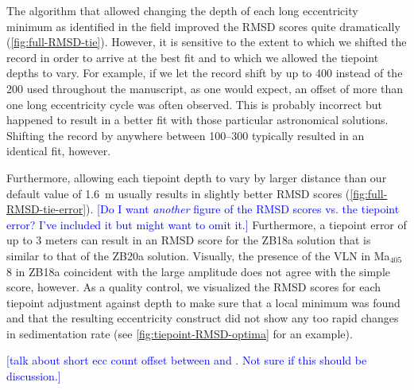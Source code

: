 \documentclass[draft]{agujournal2019}
\newcommand{\ma}[1]{Ma\(_{405}\)#1} %
\newcommand{\ijk}{\textcolor{blue}}
\begin{document}
The algorithm that allowed changing the depth of each long eccentricity minimum as identified in the field improved the \gls{RMSD} scores quite dramatically (\cref{fig:full-RMSD-tie}).
However, it is sensitive to the extent to which we shifted the record in order to arrive at the best fit and to which we allowed the tiepoint depths to vary.
For example, if we let the record shift by up to \qty{400}{\kiloyear} instead of the \qty{200}{\kiloyear} used throughout the manuscript, as one would expect, an offset of more than one long eccentricity cycle was often observed.
This is probably incorrect but happened to result in a better fit with those particular astronomical solutions.
Shifting the record by anywhere between \qtyrange{100}{300}{\kiloyear} typically resulted in an identical fit, however.

Furthermore, allowing each tiepoint depth to vary by larger distance than our default value of \qty{1.6}{\metre} usually results in slightly better \gls{RMSD} scores (\cref{fig:full-RMSD-tie-error}).
\ijk{[Do I want \emph{another} figure of the RMSD scores vs. the tiepoint error? I've included it but might want to omit it.]}
Furthermore, a tiepoint error of up to 3 meters can result in an \gls{RMSD} score for the ZB18a solution that is similar to that of the ZB20a solution.
Visually, the presence of the \gls{VLN} in \ma{8} in ZB18a coincident with the large amplitude does not agree with the simple score, however.
As a quality control, we visualized the \gls{RMSD} scores for each tiepoint adjustment against depth to make sure that a local minimum was found and that the resulting eccentricity construct did not show any too rapid changes in sedimentation rate (see \cref{fig:tiepoint-RMSD-optima} for an example).

\ijk{[talk about short ecc count offset between \cite{Batenburg2012} and \cite{Dinares-Turell2013}. Not sure if this should be discussion.]}
\end{document}
